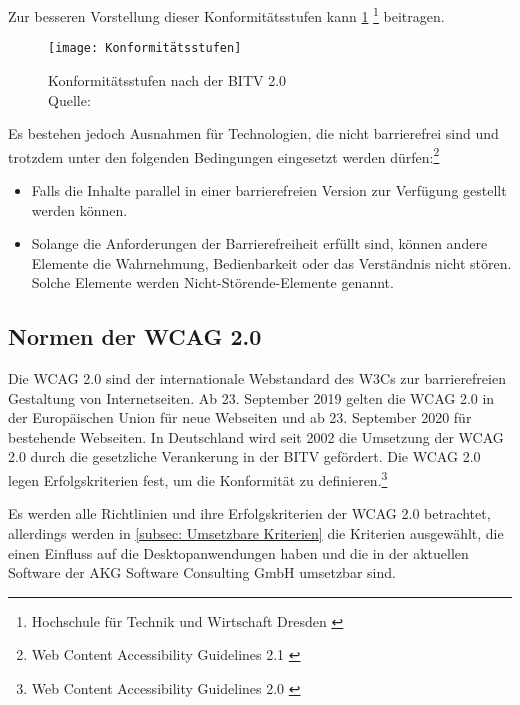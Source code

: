 Zur besseren Vorstellung dieser Konformitätsstufen kann \cref{fig:Konformitätsstufen} \footnote{Hochschule für Technik und Wirtschaft Dresden \cite{HV}} beitragen.

\begin{figure}[H]
	\centering
	\texttt{[image: Konformitätsstufen]}
	\caption[Konformitätsstufen nach der \ac{BITV} 2.0]{Konformitätsstufen nach der \ac{BITV} 2.0 \\Quelle: \cite{HV}}
	\label{fig:Konformitätsstufen}
\end{figure}

\vspace{2cm}

Es bestehen jedoch Ausnahmen für Technologien, die nicht barrierefrei sind und trotzdem unter den folgenden Bedingungen eingesetzt werden dürfen:\footnote{Web Content Accessibility Guidelines 2.1 \cite{WCAG2.1}}

\begin{itemize}
	\item Falls die Inhalte parallel in einer barrierefreien Version zur Verfügung gestellt werden können.
	\item Solange die Anforderungen der Barrierefreiheit erfüllt sind, können andere Elemente die Wahrnehmung, Bedienbarkeit oder das Verständnis nicht 
	stören. Solche Elemente werden Nicht-Störende-Elemente genannt.
\end{itemize}

\subsection{Normen der \ac{WCAG} 2.0}
Die \ac{WCAG} 2.0 sind der internationale Webstandard des \ac{W3C}s zur barrierefreien Gestaltung von Internetseiten. Ab 23. September 2019 gelten die \ac{WCAG} 2.0 in der Europäischen Union für neue Webseiten und ab 23. September 2020 für bestehende Webseiten. In Deutschland wird seit 2002 die Umsetzung der \ac{WCAG} 2.0 durch die gesetzliche Verankerung in der \ac{BITV} gefördert. Die \ac{WCAG} 2.0 legen Erfolgskriterien fest, um die Konformität zu definieren.\footnote{Web Content Accessibility Guidelines 2.0 \cite{WCAG2.0}}

Es werden alle Richtlinien und ihre Erfolgskriterien der \ac{WCAG} 2.0 betrachtet, allerdings werden in \cref{subsec: Umsetzbare Kriterien} die Kriterien ausgewählt, die einen Einfluss 
auf die Desktopanwendungen haben und die in der aktuellen Software der AKG Software Consulting GmbH umsetzbar sind.

